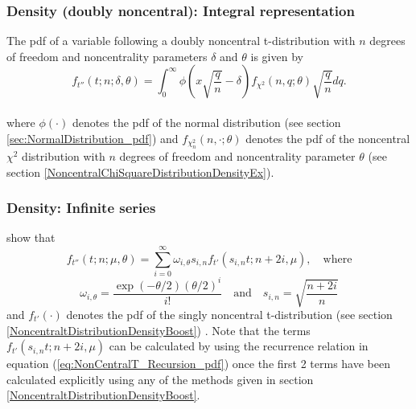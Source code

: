 \subsubsection{Density (doubly noncentral): Integral representation}
\label{DoublyNoncentraltDistributionDensity}


The pdf of a variable following a doubly noncentral  t-distribution with $n$ degrees of freedom and noncentrality parameters $\delta$ and $\theta$ is given by \citep{Witkovsky_2013}
\begin{equation}
	f_{t''}(t;n;\delta,\theta) = \int_{0}^{\infty} \phi \left(x \sqrt{\frac{q}{n}} -\delta\right) f_{\chi^2}(n, q; \theta) \sqrt{\frac{q}{n}} dq.
\end{equation} \\
where $\phi(\cdot)$ denotes the pdf of the normal distribution (see section \ref{sec:NormalDistribution_pdf}) and $f_{\chi^2_n}(n, \cdot;\theta)$ denotes the pdf of the noncentral $\chi^2$ distribution with $n$ degrees of freedom and noncentrality parameter $\theta$ (see section \ref{NoncentralChiSquareDistributionDensityEx}).




\subsubsection{Density: Infinite series}
\cite{Kocherlakota_1991} show that 
\begin{equation}  \label{eq:DoublyNonCentralT_Def_density}
	f_{t''}(t;n;\mu,\theta) = \sum_{i=0}^{\infty} \omega_{i,\theta} s_{i,n} f_{t'}(s_{i,n} t;n+2i,\mu), \quad \text{where}
\end{equation}
\begin{equation}  \label{eq:DoublyNonCentralT_Def_Factors}
	\omega_{i,\theta} = \frac{\exp(-\theta/2)(\theta/2)^i}{i!}  \quad \text{and}  \quad s_{i,n}=\sqrt{\frac{n+2i}{n}}
\end{equation}
and $f_{t'}(\cdot)$ denotes the pdf of the singly noncentral t-distribution 
(see section \ref{NoncentraltDistributionDensityBoost})
. Note that the terms $f_{t'}(s_{i,n} t;n+2i,\mu)$ can be calculated by using the recurrence relation in equation  (\ref{eq:NonCentralT_Recursion_pdf})  once the first 2 terms have been calculated explicitly using any of the methods given in section  
\ref{NoncentraltDistributionDensityBoost}.

